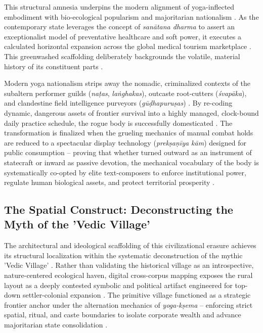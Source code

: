 \documentclass[11pt,twoside,letterpaper]{article}
\begin{document}
This structural amnesia underpins the modern alignment of yoga-inflected embodiment with bio-ecological popularism and majoritarian nationalism \cite{McCartney2021}. As the contemporary state leverages the concept of \textit{sanātana dharma} to assert an exceptionalist model of preventative healthcare and soft power, it executes a calculated horizontal expansion across the global medical tourism marketplace \cite{McCartney2021}. This greenwashed scaffolding deliberately backgrounds the volatile, material history of its constituent parts \cite{McCartney2021}. 

Modern yoga nationalism strips away the nomadic, criminalized contexts of the subaltern performer guilds (\textit{naṭas}, \textit{laṅghakas}), outcaste root-cutters (\textit{śvapāka}), and clandestine field intelligence purveyors (\textit{gūḍhapuruṣas}) \cite{McCartney2021}. By re-coding dynamic, dangerous assets of frontier survival into a highly managed, clock-bound daily practice schedule, the rogue body is successfully domesticated \cite{McCartney2021}. The transformation is finalized when the grueling mechanics of manual combat holds are reduced to a spectacular display technology (\textit{prekṣaṇīya kām}) designed for public consumption -- proving that whether turned outward as an instrument of statecraft or inward as passive devotion, the mechanical vocabulary of the body is systematically co-opted by elite text-composers to enforce institutional power, regulate human biological assets, and protect territorial prosperity \cite{McCartney2021}.

\subsection{The Spatial Construct: Deconstructing the Myth of the 'Vedic Village'}

The architectural and ideological scaffolding of this civilizational erasure achieves its structural localization within the systematic deconstruction of the mythic 'Vedic Village' \cite{McCartney2026b}. Rather than validating the historical village as an introspective, nature-centered ecological haven, digital cross-corpus mapping exposes the rural layout as a deeply contested symbolic and political artifact engineered for top-down settler-colonial expansion \cite{McCartney2026b}. The primitive village functioned as a strategic frontier anchor under the alternation mechanics of \textit{yoga-kṣema} -- enforcing strict spatial, ritual, and caste boundaries to isolate corporate wealth and advance majoritarian state consolidation \cite{McCartney2026b}.
\end{document}
